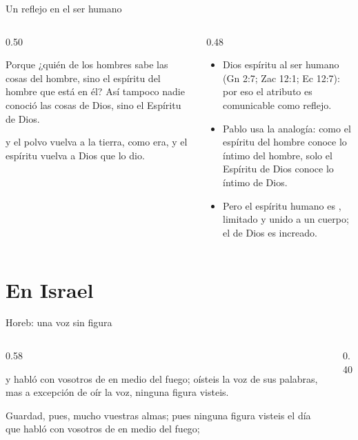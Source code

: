 \begin{frame}{Un reflejo en el ser humano}
\begin{columns}[t,onlytextwidth]
\begin{column}{0.50\textwidth}
\begin{cita}Porque ¿quién de los hombres sabe las cosas del hombre, sino el espíritu del hombre que está en él? Así tampoco nadie conoció las cosas de Dios, sino el Espíritu de Dios.\end{cita}
\begin{cita}y el polvo vuelva a la tierra, como era, y el espíritu vuelva a Dios que lo dio.\end{cita}
\end{column}
\begin{column}{0.48\textwidth}\small
\begin{itemize}
\item Dios  espíritu al ser humano (Gn 2:7; Zac 12:1; Ec 12:7): por eso el atributo es comunicable como reflejo.
\item Pablo usa la analogía: como el espíritu del hombre conoce lo íntimo del hombre, solo el Espíritu de Dios conoce lo íntimo de Dios.
\item Pero el espíritu humano es , limitado y unido a un cuerpo; el de Dios es increado.
\end{itemize}
\end{column}
\end{columns}\par\smallskip
{}
\end{frame}

\section{En Israel}

\begin{frame}{Horeb: una voz sin figura}
\begin{columns}[c,onlytextwidth]
\begin{column}{0.58\textwidth}
\begin{cita}y habló \SENOR{} con vosotros de en medio del fuego; oísteis la voz de sus palabras, mas a excepción de oír la voz, ninguna figura visteis.\end{cita}
\begin{cita}Guardad, pues, mucho vuestras almas; pues ninguna figura visteis el día que \SENOR{} habló con vosotros de en medio del fuego;\end{cita}
\end{column}
\begin{column}{0.40\textwidth}\end{column}
\end{columns}
\end{frame}

